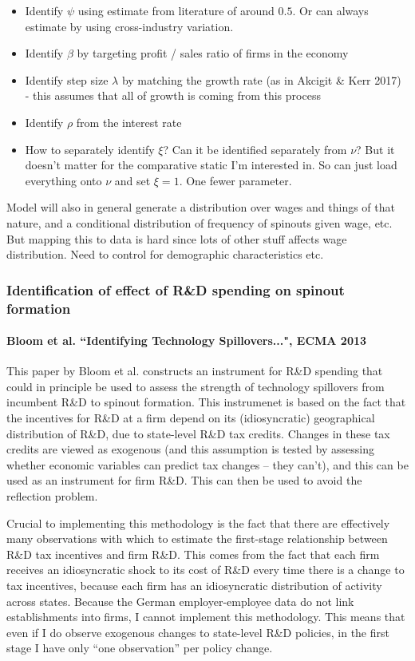 \documentclass[12pt,english]{article}
\theoremstyle{remark}
\begin{document}
\begin{itemize}
	\item Identify $\psi$ using estimate from literature of around $0.5$. Or can always estimate by using cross-industry variation.
	\item Identify $\beta$ by targeting profit / sales ratio of firms in the economy
	\item Identify step size $\lambda$ by matching the growth rate (as in Akcigit \& Kerr 2017) - this assumes that all of growth is coming from this process
	\item Identify $\rho$ from the interest rate
	\item How to separately identify $\xi$? Can it be identified separately from $\nu$? But it doesn't matter for the comparative static I'm interested in. So can just load everything onto $\nu$ and set $\xi = 1$. One fewer parameter.
\end{itemize}

Model will also in general generate a distribution over wages and things of that nature, and a conditional distribution of frequency of spinouts given wage, etc. But mapping this to data is hard since lots of other stuff affects wage distribution. Need to control for demographic characteristics etc. 

\subsubsection{Identification of effect of R\&D spending on spinout formation}

\paragraph{Bloom et al. ``Identifying Technology Spillovers...", ECMA 2013}

This paper by Bloom et al. constructs an instrument for R\&D spending that could in principle be used to assess the strength of technology spillovers from incumbent R\&D to spinout formation. This instrumenet is based on the fact that the incentives for R\&D at a firm depend on its (idiosyncratic) geographical distribution of R\&D, due to state-level R\&D tax credits. Changes in these tax credits are viewed as exogenous (and this assumption is tested by assessing whether economic variables can predict tax changes -- they can't), and this can be used as an instrument for firm R\&D. This can then be used to avoid the reflection problem.

Crucial to implementing this methodology is the fact that there are effectively many observations with which to estimate the first-stage relationship between R\&D tax incentives and firm R\&D. This comes from the fact that each firm receives an idiosyncratic shock to its cost of R\&D every time there is a change to tax incentives, because each firm has an idiosyncratic distribution of activity across states. Because the German employer-employee data do not link establishments into firms, I cannot implement this methodology. This means that even if I do observe exogenous changes to state-level R\&D policies, in the first stage I have only ``one observation'' per policy change.
\end{document}
